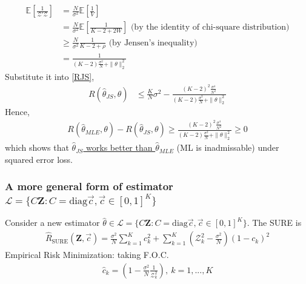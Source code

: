 \documentclass[11pt]{elegantbook}
\begin{document}
\begin{equation}
    \begin{aligned}
        \mathbb{E}\left[\frac{1}{\mathcal{Z}'\mathcal{Z}}\right]&=\frac{N}{\sigma^2}\mathbb{E}\left[\frac{1}{V}\right]\\
        &=\frac{N}{\sigma^2}\mathbb{E}\left[\frac{1}{K-2+2W}\right] \text{ (by the identity of chi-square distribution)}\\
        &\geq \frac{N}{\sigma^2}\frac{1}{K-2+\rho} \text{ (by Jensen's inequality)}\\
        &=\frac{1}{(K-2)\frac{\sigma^2}{N}+\|\theta\|_2^2}
    \end{aligned}
    \nonumber
\end{equation}
Substitute it into \ref{RJS},
\begin{equation}
    \begin{aligned}
        R(\hat{\theta}_{JS},\theta)&\leq \frac{K}{N}\sigma^2-\frac{(K-2)^2\frac{\sigma^4}{N^2}}{(K-2)\frac{\sigma^2}{N}+\|\theta\|_2^2}
    \end{aligned}
    \nonumber
\end{equation}
Hence,
\begin{equation}
    \begin{aligned}
        R(\hat{\theta}_{MLE},\theta)-R(\hat{\theta}_{JS},\theta)\geq \frac{(K-2)^2\frac{\sigma^4}{N^2}}{(K-2)\frac{\sigma^2}{N}+\|\theta\|_2^2}\geq 0
    \end{aligned}
    \nonumber
\end{equation}
which shows that \underline{$\hat{\theta}_{JS}$ works better than $\hat{\theta}_{MLE}$} (ML is inadmissable) under squared error loss.


\subsubsection{A more general form of estimator $\mathcal{L}=\{C \mathbf{Z}:C=\text{diag}\vec{c},\vec{c}\in[0,1]^K\}$}
Consider a new estimator $\hat{\theta}\in \mathcal{L}=\{C \mathbf{Z}:C=\text{diag}\vec{c},\vec{c}\in[0,1]^K\}$. The SURE is
\begin{equation}
    \begin{aligned}
        \hat{R}_\text{SURE}\left(\mathbf{Z},\vec{c}\right)=\frac{\sigma^2}{N}\sum_{k=1}^K c_k^2+\sum_{k=1}^K\left(\mathcal{Z}_k^2-\frac{\sigma^2}{N}\right)(1-c_k)^2
    \end{aligned}
    \nonumber
\end{equation}
Empirical Risk Minimization: taking F.O.C.
\begin{equation}
    \begin{aligned}
        \hat{c}_k=\left(1-\frac{\sigma^2}{N}\frac{1}{\mathcal{Z}_k^2}\right),\ k=1,...,K
    \end{aligned}
    \nonumber
\end{equation}
\end{document}
